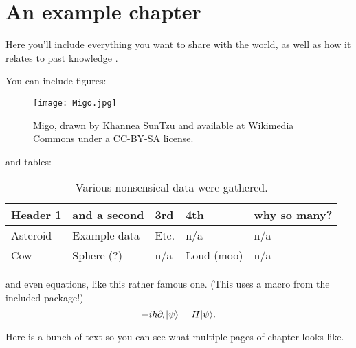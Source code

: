 \chapter{An example chapter}


Here you'll include everything you want to share with the world, as well as how
it relates to past knowledge \cite{armitage1901}.


You can include figures:

\begin{figure}[ht]
    \centering
    \texttt{[image: Migo.jpg]}
    \caption[Migo]
            {Migo, drawn by
            \href{https://www.artstation.com/khanneasuntzu}
                 {Khannea SunTzu} and available at 
             \href{https://commons.wikimedia.org/wiki/File:Migo.jpg}
                  {Wikimedia Commons}
            under a CC-BY-SA license.}
    \label{fig:migo}
\end{figure}

and tables:

\begin{table}[ht]
\begin{tabular}{@{}lllll@{}}
    \toprule
    Header 1 & and a second & 3rd & 4th & why so many? \\
    \midrule
    Asteroid & Example data & Etc. & n/a & n/a \\
    Cow & Sphere (?) & n/a & Loud (moo) & n/a \\
    \bottomrule
\end{tabular}
\caption[Cow and Co.]{Various nonsensical data were gathered.}
\label{tab:cow}
\end{table}

and even equations, like this rather famous one. (This uses a macro
from the included package!)
\begin{equation}
    - i \hbar \partial_t \lvert\psi\rangle = H \lvert\psi\rangle.
\end{equation}

Here is a bunch of text so you can see what multiple pages of chapter looks like.

\lipsum[1-19]